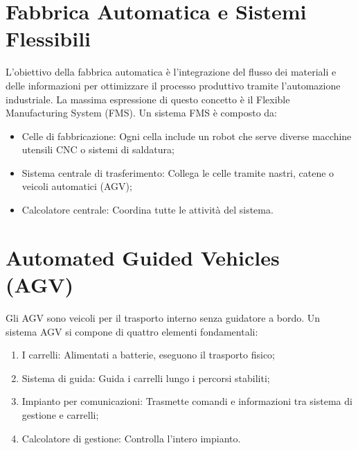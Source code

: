 %
%
\section{Fabbrica Automatica e Sistemi Flessibili}
L'obiettivo della fabbrica automatica è l'integrazione del flusso dei materiali e delle informazioni per ottimizzare il processo produttivo tramite l'automazione industriale. La massima espressione di questo concetto è il Flexible Manufacturing System (FMS). Un sistema FMS è composto da:
\begin{itemize}
    \item Celle di fabbricazione: Ogni cella include un robot che serve diverse macchine utensili CNC o sistemi di saldatura;
    \item Sistema centrale di trasferimento: Collega le celle tramite nastri, catene o veicoli automatici (AGV);
    \item Calcolatore centrale: Coordina tutte le attività del sistema.
\end{itemize}

%
\section{Automated Guided Vehicles (AGV)}
Gli AGV sono veicoli per il trasporto interno senza guidatore a bordo. Un sistema AGV si compone di quattro elementi fondamentali:
\begin{enumerate}
    \item I carrelli: Alimentati a batterie, eseguono il trasporto fisico;
    \item Sistema di guida: Guida i carrelli lungo i percorsi stabiliti;
    \item Impianto per comunicazioni: Trasmette comandi e informazioni tra sistema di gestione e carrelli;
    \item Calcolatore di gestione: Controlla l'intero impianto.
\end{enumerate}

%
